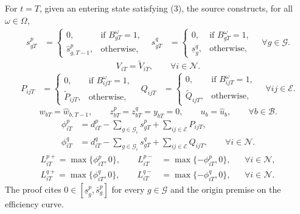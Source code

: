 \documentclass[10pt]{article}
\begin{document}
For $t=T$, given an entering state satisfying (3), the source constructs, for all $\omega\in\Omega$,
\begin{equation}
\begin{aligned}
s_{gT}^p&=\begin{cases}0,&\text{if }B_{gT}^\omega=1,\\ \hat s_{g,T-1}^p,&\text{otherwise},\end{cases}
& s_{gT}^q&=\begin{cases}0,&\text{if }B_{gT}^\omega=1,\\ \underline s_g^q,&\text{otherwise},\end{cases}
\quad\forall g\in\mathcal G.
\end{aligned}\tag{4a}
\end{equation}
\begin{equation}
V_{iT}=\widetilde V_{iT},\qquad\forall i\in\mathcal N.\tag{4b}
\end{equation}
\begin{equation}
\begin{aligned}
P_{ijT}&=\begin{cases}0,&\text{if }B_{ijT}^\omega=1,\\\widetilde P_{ijT},&\text{otherwise},\end{cases}
&Q_{ijT}&=\begin{cases}0,&\text{if }B_{ijT}^\omega=1,\\\widetilde Q_{ijT},&\text{otherwise},\end{cases}
\quad\forall ij\in\mathcal E.
\end{aligned}\tag{4c}
\end{equation}
\begin{equation}
w_{bT}=\hat w_{b,T-1},\qquad z_{bT}^p=z_{bT}^q=y_{bT}=0,\qquad u_b=\hat u_b,\qquad\forall b\in\mathcal B.\tag{4d}
\end{equation}
\begin{equation}
\begin{aligned}
\phi_{iT}^p&=d_{iT}^p-\sum_{g\in\mathcal G_i}s_{gT}^p+\sum_{ij\in\mathcal E}P_{ijT},\\
\phi_{iT}^q&=d_{iT}^q-\sum_{g\in\mathcal G_i}s_{gT}^q+\sum_{ij\in\mathcal E}Q_{ijT},\qquad\forall i\in\mathcal N.
\end{aligned}\tag{4e}
\end{equation}
\begin{align}
L_{iT}^{p+}=\max\{\phi_{iT}^p,0\},\qquad L_{iT}^{p-}&=\max\{-\phi_{iT}^p,0\},&&\forall i\in\mathcal N,\tag{4f}\\
L_{iT}^{q+}=\max\{\phi_{iT}^q,0\},\qquad L_{iT}^{q-}&=\max\{-\phi_{iT}^q,0\},&&\forall i\in\mathcal N.\tag{4g}
\end{align}
The proof cites $0\in[\underline s_g^p,\bar s_g^p]$ for every $g\in\mathcal G$ and the origin premise on the efficiency curve.
\end{document}
